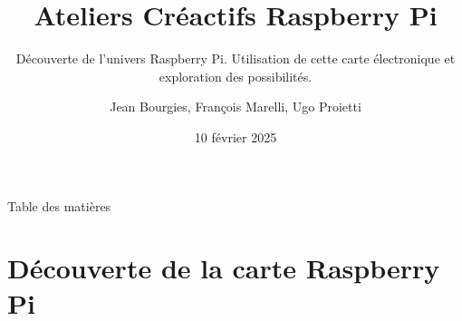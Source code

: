 \documentclass[aspectratio=169,xcolor=dvipsnames]{beamer}
\title{Ateliers Créactifs Raspberry Pi}
\subtitle{Découverte de l'univers Raspberry Pi. Utilisation de cette carte électronique et exploration des possibilités.}
\author{Jean Bourgies, François Marelli, Ugo Proietti}
\date{10 février 2025}
\begin{document}
\begin{frame}
    \titlepage
\end{frame}

\begin{frame}{Table des matières}
    \tableofcontents
\end{frame}

\section{Découverte de la carte Raspberry Pi}
\end{document}
